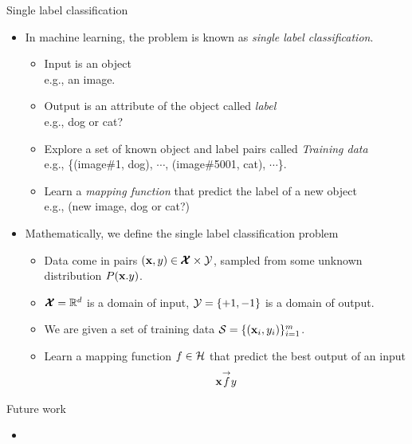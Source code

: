\documentclass[first=dgreen,second=purple,logo=yellowexc]{aaltoslides}
\begin{document}
{\begin{frame}{Single label classification}
	\begin{itemize}
		\item In machine learning, the problem is known as \textit{\color{aaltoblue} single label classification}.
		\begin{itemize}
			\footnotesize
			\item Input is an object\\
			e.g., an image.
			\item Output is an attribute of the object called \textit{\color{aaltoblue} label}\\
			e.g., dog or cat?
			\item Explore a set of known object and label pairs called \textit{\color{aaltoblue} Training data} \\
			e.g., \{(image\#1, dog), $\cdots$, (image\#5001, cat), $\cdots$\}.
			\item Learn a \textit{\color{aaltoblue}mapping function} that predict the label of a new object\\
			e.g., (new image, dog or cat?)
		\end{itemize}
		\item Mathematically, we define the single label classification problem
		\begin{itemize}
			\footnotesize
			\item Data come in pairs $(\mathbf {x},y)\in\pmb {\mathcal{X}}\times\mathcal{Y}$, sampled from some unknown distribution $P(\mathbf {x}.y)$.
			\item $\pmb {\mathcal{X}}=\mathbb{R}^d$ is a domain of input, $\mathcal{Y}=\{+1,-1\}$ is a domain of output.
			\item We are given a set of training data $\mathcal{S}=\{(\mathbf {x}_i,y_i)\}_{i=1}^{m}$.
			\item Learn a mapping function $f\in\mathcal{H}$ that predict the best output of an input
			\begin{align*}
				\mathbf {x}\overset{\rightarrow}{f}y
			\end{align*}
		\end{itemize}
	\end{itemize}
\end{frame}



\begin{frame}{Future work}
	\begin{itemize}
		\item 
	\end{itemize}
\end{frame}


}
\end{document}
